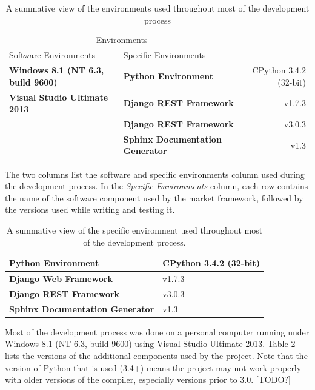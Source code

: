 \documentclass[bsc,frontabs,twoside,singlespacing,parskip,deptreport]{infthesis}     %
\begin{document}
\flushleft\begin {table}
\caption{A summative view of the environments used throughout most of the development process}

\begin{tabular}{llr}
\multicolumn{2}{c}{Environments}  \\

Software Environments     & Specific Environments &   \\
\hline
\textbf{Windows 8.1 (NT 6.3, build 9600)}  & \textbf{Python Environment} & CPython 3.4.2 (32-bit)      \\
\textbf{Visual Studio Ultimate 2013}    & \textbf{Django REST Framework}  & v1.7.3      \\
       & \textbf{Django REST Framework} & v3.0.3     \\
 & \textbf{Sphinx Documentation Generator}                & v1.3         \\
\hline
\end{tabular}
\hfill
\label{tab:dev-env}
{The two columns list the software  and specific environments column used during the development process. In the {\it Specific Environments} column, each row contains the name of the software component used by the market framework, followed by the versions used while writing and testing it. }
\end{table}

\begin{table}[h]
\centering
\caption{A summative view of the specific environment used throughout most of the development process.}

\begin{tabular}{|l|l|}
\hline
\textbf{Python Environment}    & CPython 3.4.2 (32-bit)          \\ \hline
\textbf{Django Web Framework}  & v1.7.3                         \\ \hline
\textbf{Django REST Framework} & v3.0.3                            \\ \hline
\textbf{Sphinx Documentation Generator}                & v1.3                          \\ \hline
\end{tabular}
\label{tab:dev-env}
 
\end{table}

	Most of the development process was done on a personal computer running under Windows 8.1 (NT 6.3, build 9600) using Visual Studio Ultimate 2013. Table \ref{tab:dev-env} lists the versions of the additional components used by the project. Note that the version of Python that is used (3.4+) means the project may not work properly with older versions of the compiler, especially versions prior to $3.0$. [TODO?]
\end{document}
